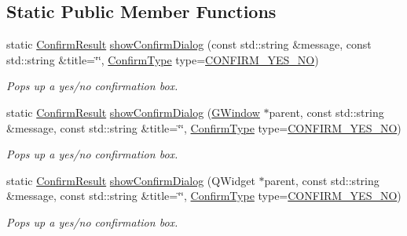 \subsection*{Static Public Member Functions}
\begin{DoxyCompactItemize}
\item 
static \mbox{\hyperlink{classsgl_1_1GOptionPane_a1cc9e8685029e39646671ed71f32d47d}{Confirm\+Result}} \mbox{\hyperlink{classsgl_1_1GOptionPane_a779ca75a58dcaba1000f064f23f83291}{show\+Confirm\+Dialog}} (const std\+::string \&message, const std\+::string \&title=\char`\"{}\char`\"{}, \mbox{\hyperlink{classsgl_1_1GOptionPane_a6a1aaf19c06f5a6bef89ea6415547049}{Confirm\+Type}} type=\mbox{\hyperlink{classsgl_1_1GOptionPane_a6a1aaf19c06f5a6bef89ea6415547049a964914d27eb73a202938a53f43adc4b1}{C\+O\+N\+F\+I\+R\+M\+\_\+\+Y\+E\+S\+\_\+\+NO}})
\begin{DoxyCompactList}\small\item\em Pops up a yes/no confirmation box. \end{DoxyCompactList}\item 
static \mbox{\hyperlink{classsgl_1_1GOptionPane_a1cc9e8685029e39646671ed71f32d47d}{Confirm\+Result}} \mbox{\hyperlink{classsgl_1_1GOptionPane_a9afd93d6b7b63d77370c87e60285ae71}{show\+Confirm\+Dialog}} (\mbox{\hyperlink{classsgl_1_1GWindow}{G\+Window}} $\ast$parent, const std\+::string \&message, const std\+::string \&title=\char`\"{}\char`\"{}, \mbox{\hyperlink{classsgl_1_1GOptionPane_a6a1aaf19c06f5a6bef89ea6415547049}{Confirm\+Type}} type=\mbox{\hyperlink{classsgl_1_1GOptionPane_a6a1aaf19c06f5a6bef89ea6415547049a964914d27eb73a202938a53f43adc4b1}{C\+O\+N\+F\+I\+R\+M\+\_\+\+Y\+E\+S\+\_\+\+NO}})
\begin{DoxyCompactList}\small\item\em Pops up a yes/no confirmation box. \end{DoxyCompactList}\item 
static \mbox{\hyperlink{classsgl_1_1GOptionPane_a1cc9e8685029e39646671ed71f32d47d}{Confirm\+Result}} \mbox{\hyperlink{classsgl_1_1GOptionPane_a25726b3ff4882c3a7ef9be5fd4c4f2ef}{show\+Confirm\+Dialog}} (Q\+Widget $\ast$parent, const std\+::string \&message, const std\+::string \&title=\char`\"{}\char`\"{}, \mbox{\hyperlink{classsgl_1_1GOptionPane_a6a1aaf19c06f5a6bef89ea6415547049}{Confirm\+Type}} type=\mbox{\hyperlink{classsgl_1_1GOptionPane_a6a1aaf19c06f5a6bef89ea6415547049a964914d27eb73a202938a53f43adc4b1}{C\+O\+N\+F\+I\+R\+M\+\_\+\+Y\+E\+S\+\_\+\+NO}})
\begin{DoxyCompactList}\small\item\em Pops up a yes/no confirmation box. \end{DoxyCompactList}\item 

\end{DoxyCompactItemize}
